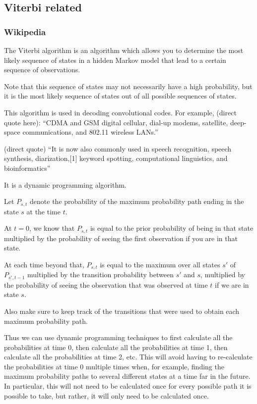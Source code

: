 \documentclass{article}
\begin{document}
\subsection{Viterbi related}

\subsubsection{Wikipedia}

The Viterbi algorithm is an algorithm which allows you to determine the most likely sequence of states in a hidden Markov model that lead to a certain sequence of observations.

Note that this sequence of states may not necessarily have a high probability, but it is the most likely sequence of states out of all possible sequences of states.

This algorithm is used in decoding convolutional codes. For example, (direct quote here):  ``CDMA and GSM digital cellular, dial-up modems, satellite, deep-space communications, and 802.11 wireless LANs.''

(direct quote) ``It is now also commonly used in speech recognition, speech synthesis, diarization,[1] keyword spotting, computational linguistics, and bioinformatics''

It is a dynamic programming algorithm.

Let $P_{s,t}$ denote the probability of the maximum probability path ending in the state $s$ at the time $t$.

At $t = 0$, we know that $P_{s,t}$ is equal to the prior probability of being in that state multiplied by the probability of seeing the first observation if you are in that state.

At each time beyond that, $P_{s,t}$ is equal to the maximum over all states $s'$ of $P_{s', t-1}$ multiplied by the transition probability between $s'$ and $s$, multiplied by the probability of seeing the observation that was observed at time $t$ if we are in state $s$.

Also make sure to keep track of the transitions that were used to obtain each maximum probability path.

Thus we can use dynamic programming techniques to first calculate all the probabilities at time 0, then calculate all the probabilities at time 1, then calculate all the probabilities at time 2, etc. This will avoid having to re-calculate the probabilities at time 0 multiple times when, for example, finding the maximum probability paths to several different states at a time far in the future. In particular, this will not need to be calculated once for every possible path it is possible to take, but rather, it will only need to be calculated once.
\end{document}
